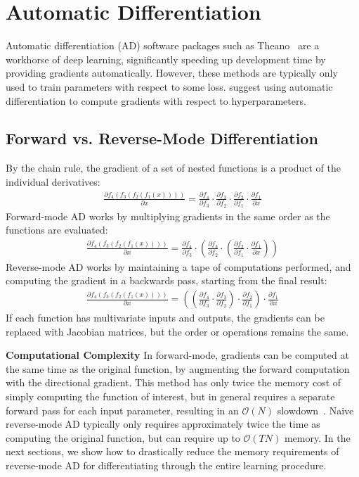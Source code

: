 \documentclass{article}
\newcommand{\pderiv}[2]{\frac{\partial #1}{\partial #2}}
\newcommand{\numhypers}{N}
\newcommand{\numsteps}{T}
\begin{document}
\section{Automatic Differentiation}

Automatic differentiation (AD) software packages such as Theano~\cite{Bastien-Theano-2012, bergstra2010scipy} are a workhorse of deep learning, significantly speeding up development time by providing gradients automatically.
However, these methods are typically only used to train parameters with respect to some loss.
\citet{Autodiff14} suggest using automatic differentiation to compute gradients with respect to hyperparameters.

\subsection{Forward vs. Reverse-Mode Differentiation}

By the chain rule, the gradient of a set of nested functions is a product of the individual derivatives:
%
\begin{align*}
\pderiv{f_4(f_3(f_2(f_1(x))))}{x} = \pderiv{f_4}{f_3} \cdot \pderiv{f_3}{f_2} \cdot \pderiv{f_2}{f_1} \cdot \pderiv{f_1}{x}
\end{align*}
%
Forward-mode AD works by multiplying gradients in the same order as the functions are evaluated:
%
\begin{align*}
\pderiv{f_4(f_3(f_2(f_1(x))))}{x} = \pderiv{f_4}{f_3} \cdot \left( \pderiv{f_3}{f_2} \cdot \left( \pderiv{f_2}{f_1} \cdot \pderiv{f_1}{x} \right) \right)
\end{align*}
%
Reverse-mode AD works by maintaining a tape of computations performed, and computing the gradient in a backwards pass, starting from the final result:
%
\begin{align*}
\pderiv{f_4(f_3(f_2(f_1(x))))}{x} = \left(  \left(  \pderiv{f_4}{f_3} \cdot \pderiv{f_3}{f_2} \right) \cdot \pderiv{f_2}{f_1} \right) \cdot \pderiv{f_1}{x} 
\end{align*}
%
If each function has multivariate inputs and outputs, the gradients can be replaced with Jacobian matrices, but the order or operations remains the same.

\textbf{Computational Complexity}
In forward-mode, gradients can be computed at the same time as the original function, by augmenting the forward computation with the directional gradient.
This method has only twice the memory cost of simply computing the function of interest, but in general requires a separate forward pass for each input parameter, resulting in an $\mathcal{O}(\numhypers)$ slowdown~\cite{pearlmutter2008reverse}.
Naive reverse-mode AD typically only requires approximately twice the time as computing the original function, but can require up to $\mathcal{O}(\numsteps\numhypers)$ memory.
In the next sections, we show how to drastically reduce the memory requirements of reverse-mode AD for differentiating through the entire learning procedure.
\end{document}
